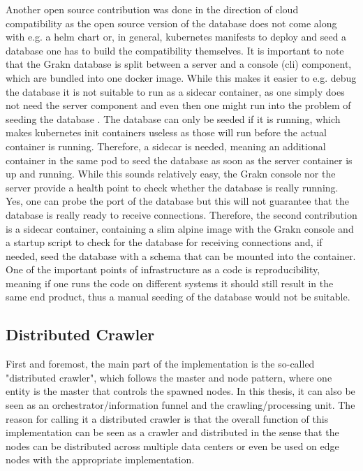 Another open source contribution was done in the direction of cloud compatibility as the open source version of the database does not come along with e.g. a helm chart or, in general, kubernetes manifests to deploy and seed a database one has to build the compatibility themselves. It is important to note that the Grakn database is split between a server and a console (cli) component, which are bundled into one docker image. While this makes it easier to e.g. debug the database it is not suitable to run as a sidecar container, as one simply does not need the server component and even then one might run into the problem of seeding the database . The database can only be seeded if it is running, which makes kubernetes init containers useless as those will run before the actual container is running. Therefore, a sidecar is needed, meaning an additional container in the same pod to seed the database as soon as the server container is up and running. While this sounds relatively easy, the Grakn console nor the server provide a health point to check whether the database is really running. Yes, one can probe the port of the database but this will not guarantee that the database is really ready to receive connections. Therefore, the second contribution is a sidecar container, containing a slim alpine image with the Grakn console and a startup script to check for the database for receiving connections and, if needed, seed the database with a schema that can be mounted into the container.
One of the important points of infrastructure as a code is reproducibility, meaning if one runs the code on different systems it should still result in the same end product, thus a manual seeding of the database would not be suitable.

\subsection{Distributed Crawler}
First and foremost, the main part of the implementation is the so-called "distributed crawler", which follows the master and node pattern, where one entity is the master that controls the spawned nodes. In this thesis, it can also be seen as an orchestrator/information funnel and the crawling/processing unit. The reason for calling it a distributed crawler is that the overall function of this implementation can be seen as a crawler and distributed in the sense that the nodes can be distributed across multiple data centers or even be used on edge nodes with the appropriate implementation.

